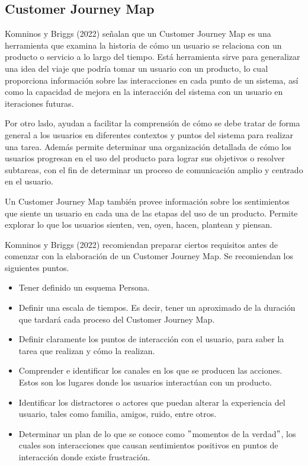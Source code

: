 
\subsection{Customer Journey Map}
\label{CustomerJourneyMapCap3}

Komninos y Briggs (2022) señalan que un Customer Journey Map es una herramienta que examina la historia de cómo un usuario se relaciona con un producto o servicio a lo largo del tiempo. Está herramienta sirve para generalizar una idea del viaje que podría tomar un usuario con un producto, lo cual proporciona información sobre las interacciones en cada punto de un sistema, así como la capacidad de mejora en la interacción del sistema con un usuario en iteraciones futuras.

Por otro lado, ayudan a facilitar la comprensión de cómo se debe tratar de forma general a los usuarios en diferentes contextos y puntos del sistema para realizar una tarea. Además permite determinar una organización detallada de cómo los usuarios progresan en el uso del producto para lograr sus objetivos o resolver subtareas, con el fin de determinar un proceso de comunicación amplio y centrado en el usuario.

Un Customer Journey Map también provee información sobre los sentimientos que siente un usuario en cada una de las etapas del uso de un producto. Permite explorar lo que los usuarios sienten, ven, oyen, hacen, plantean y piensan.

Komninos y Briggs (2022) recomiendan preparar ciertos requisitos antes de comenzar con la elaboración de un Customer Journey Map. Se recomiendan los siguientes puntos.

\begin{itemize}
  \item Tener definido un esquema Persona.
  \item Definir una escala de tiempos. Es decir, tener un aproximado de la duración que tardará cada proceso del Customer Journey Map.
  \item Definir claramente los puntos de interacción con el usuario, para saber la tarea que realizan y cómo la realizan.
  \item Comprender e identificar los canales en los que se producen las acciones. Estos son los lugares donde los usuarios interactúan con un producto.
  \item Identificar los distractores o actores que puedan alterar la experiencia del usuario, tales como familia, amigos, ruido, entre otros.
  \item Determinar un plan de lo que se conoce como $"$momentos de la verdad$"$, los cuales son interacciones que causan sentimientos positivos en puntos de interacción donde existe frustración.
\end{itemize}

